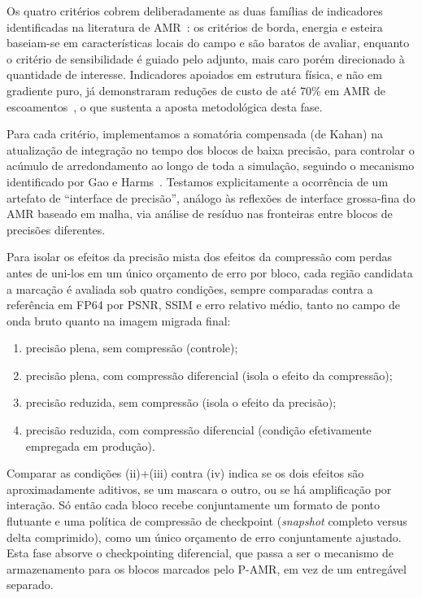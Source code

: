 \documentclass[12pt,a4paper]{article}
\newcommand{\pamr}{P\nobreakdash-AMR}
\begin{document}
Os quatro critérios cobrem deliberadamente as duas famílias de indicadores
identificadas na literatura de AMR~\cite{vivarelli2025review}: os critérios
de borda, energia e esteira baseiam-se em características locais do campo e
são baratos de avaliar, enquanto o critério de sensibilidade é guiado pelo
adjunto, mais caro porém direcionado à quantidade de interesse. Indicadores
apoiados em estrutura física, e não em gradiente puro, já demonstraram
reduções de custo de até 70\% em AMR de escoamentos~\cite{kumar2025dominant},
o que sustenta a aposta metodológica desta fase.

Para cada critério, implementamos a somatória compensada (de Kahan) na
atualização de integração no tempo dos blocos de baixa precisão, para
controlar o acúmulo de arredondamento ao longo de toda a simulação,
seguindo o mecanismo identificado por Gao e Harms~\cite{gao2023half}.
Testamos explicitamente a ocorrência de um artefato de ``interface de
precisão'', análogo às reflexões de interface grossa-fina do AMR
baseado em malha, via análise de resíduo nas fronteiras entre blocos
de precisões diferentes.

Para isolar os efeitos da precisão mista dos efeitos da compressão com
perdas antes de uni-los em um único orçamento de erro por bloco, cada
região candidata a marcação é avaliada sob quatro condições, sempre
comparadas contra a referência em FP64 por PSNR, SSIM e erro relativo
médio, tanto no campo de onda bruto quanto na imagem migrada final:

\begin{enumerate}
  \item precisão plena, sem compressão (controle);
  \item precisão plena, com compressão diferencial (isola o efeito da
        compressão);
  \item precisão reduzida, sem compressão (isola o efeito da precisão);
  \item precisão reduzida, com compressão diferencial (condição
        efetivamente empregada em produção).
\end{enumerate}

Comparar as condições (ii)+(iii) contra (iv) indica se os dois efeitos são
aproximadamente aditivos, se um mascara o outro, ou se há amplificação por
interação. Só então cada bloco recebe conjuntamente um formato de ponto
flutuante e uma política de compressão de checkpoint (\emph{snapshot}
completo versus delta comprimido), como um único orçamento de erro
conjuntamente ajustado. Esta fase absorve o checkpointing diferencial, que
passa a ser o mecanismo de armazenamento para os blocos marcados pelo
\pamr{}, em vez de um entregável separado.
\end{document}

